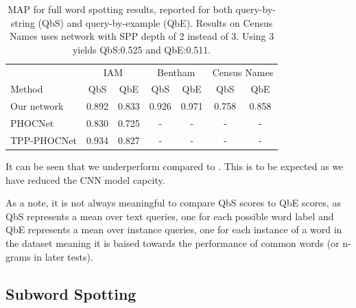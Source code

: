 \documentclass[ms,electronic,twosidetoc,letterpaper,chaptercenter,parttop,lol,lof,lot]{byumsphd}
\begin{document}
\begin{table}
\centering
\begin{tabular}{| l | c  c | c c | c c |}
  \hline
   & \multicolumn{2}{c|}{IAM} & \multicolumn{2}{c|}{Bentham} & \multicolumn{2}{c|}{Census Names}\\
  Method & QbS & QbE & QbS & QbE & QbS & QbE\\
  \hline		
  Our network  &  0.892 & 0.833  &  0.926 & 0.971  &  0.758 & 0.858  %
  \\
  PHOCNet\cite{sudholt2016} & 0.830 & 0.725 & - & - & - & - \\
  TPP-PHOCNet\cite{sudholt2017} & 0.934 & 0.827 & - & - & - & - \\
  \hline  
\end{tabular}
\caption{MAP for full word spotting results, reported for both query-by-string (QbS) and query-by-example (QbE). Results on Census Names uses network with SPP depth of 2 instead of 3. Using 3 yields QbS:0.525 and QbE:0.511.}
\label{tab:wordspottingresults}
\end{table}

It can be seen that we underperform compared to \cite{sudholt2017}. This is to be expected as we have reduced the CNN model capcity.

As a note, it is not always meaningful to compare QbS scores to QbE scores, as QbS represents a mean over text queries, one for each possible word label and QbE represents a mean over instance queries, one for each instance of a word in the dataset meaning it is baised towards the performance of common words (or n-grams in later tests).

\subsection{Subword Spotting}
\end{document}
